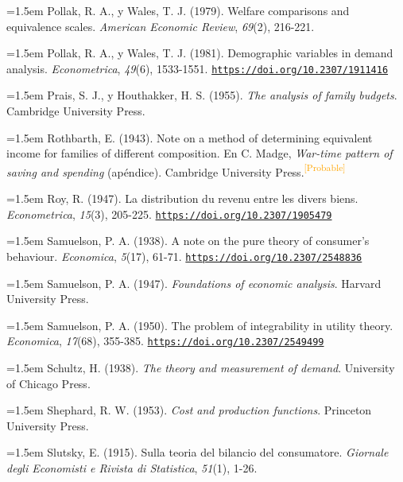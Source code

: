 \documentclass[10pt,a4paper]{article}
\begin{document}
\noindent\hangindent=1.5em Pollak, R. A., y Wales, T. J. (1979). Welfare comparisons and equivalence scales. \textit{American Economic Review}, \textit{69}(2), 216-221.

\noindent\hangindent=1.5em Pollak, R. A., y Wales, T. J. (1981). Demographic variables in demand analysis. \textit{Econometrica}, \textit{49}(6), 1533-1551. \href{https://doi.org/10.2307/1911416}{\nolinkurl{https://doi.org/10.2307/1911416}}

\noindent\hangindent=1.5em Prais, S. J., y Houthakker, H. S. (1955). \textit{The analysis of family budgets}. Cambridge University Press.

\noindent\hangindent=1.5em Rothbarth, E. (1943). Note on a method of determining equivalent income for families of different composition. En C. Madge, \textit{War-time pattern of saving and spending} (apéndice). Cambridge University Press.\textcolor{orange}{\textsuperscript{[Probable]}}

\noindent\hangindent=1.5em Roy, R. (1947). La distribution du revenu entre les divers biens. \textit{Econometrica}, \textit{15}(3), 205-225. \href{https://doi.org/10.2307/1905479}{\nolinkurl{https://doi.org/10.2307/1905479}}

\noindent\hangindent=1.5em Samuelson, P. A. (1938). A note on the pure theory of consumer's behaviour. \textit{Economica}, \textit{5}(17), 61-71. \href{https://doi.org/10.2307/2548836}{\nolinkurl{https://doi.org/10.2307/2548836}}

\noindent\hangindent=1.5em Samuelson, P. A. (1947). \textit{Foundations of economic analysis}. Harvard University Press.

\noindent\hangindent=1.5em Samuelson, P. A. (1950). The problem of integrability in utility theory. \textit{Economica}, \textit{17}(68), 355-385. \href{https://doi.org/10.2307/2549499}{\nolinkurl{https://doi.org/10.2307/2549499}}

\noindent\hangindent=1.5em Schultz, H. (1938). \textit{The theory and measurement of demand}. University of Chicago Press.

\noindent\hangindent=1.5em Shephard, R. W. (1953). \textit{Cost and production functions}. Princeton University Press.

\noindent\hangindent=1.5em Slutsky, E. (1915). Sulla teoria del bilancio del consumatore. \textit{Giornale degli Economisti e Rivista di Statistica}, \textit{51}(1), 1-26.
\end{document}
